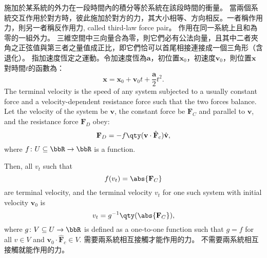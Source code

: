 \documentclass[a4paper,12pt]{article}
\begin{document}
施加於某系統的外力在一段時間內的積分等於系統在該段時間的衝量。
當兩個系統交互作用於對方時，彼此施加於對方的力，其大小相等、方向相反。一者稱作用力，則另一者稱反作用力, called third-law force pair。
作用在同一系統上且和為零的一組外力。
三維空間中三向量合為零，則它們必有公法向量，且其中二者夾角之正弦值與第三者之量值成正比，即它們恰可以首尾相接連接成一個三角形（含退化）。
指加速度恆定之運動。令加速度恆為$\mathbf{a}$，初位置$\mathbf{x}_0$，初速度$\mathbf{v}_0$，則位置$\mathbf{x}$對時間$t$的函數為：
\[\mathbf{x}=\mathbf{x}_0+\mathbf{v}_0t+\frac{\mathbf{a}}{2}t^2.\]
The terminal velocity is the speed of any system subjected to a usually constant force and a velocity-dependent resistance force such that the two forces balance. Let the velocity of the system be $\mathbf{v}$, the constant force be $\mathbf{F}_C$ and parallel to $\mathbf{v}$, and the resistance force $\mathbf{F}_D$ obey:
\[\mathbf{F}_D=-f\qty(\mathbf{v}\cdot\hat{\mathbf{F}}_c)\hat{\mathbf{v}},\]
where $f\colon U\subseteq\bbR\to\bbR$ is a function.

Then, all $v_t$ such that
\[f(v_t)=\abs{\mathbf{F}_C}\]
are terminal velocity, and the terminal velocity $v_t$ for one such system with initial velocity $\mathbf{v}_0$ is
\[v_t=g^{-1}\qty(\abs{\mathbf{F}_C}),\]
where $g\colon V\subseteq U\to\bbR$ is defined as a one-to-one function such that $g=f$ for all $v\in V$ and $\mathbf{v}_0\cdot\hat{\mathbf{F}}_c\in V$.
需要兩系統相互接觸才能作用的力。
不需要兩系統相互接觸就能作用的力。
\end{document}
